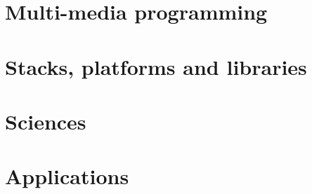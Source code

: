 \documentclass{book}
\begin{document}
\chapter{Multi-media programming}




\chapter{Stacks, platforms and libraries}









\chapter{Sciences}




\chapter{Applications}











%

\end{document}
